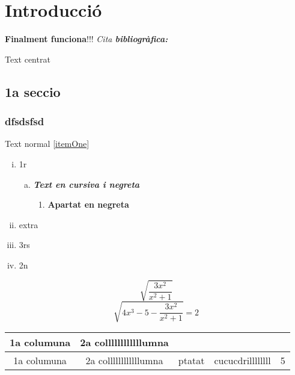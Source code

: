 \chapter{Introducció}

\textbf{Finalment funciona}!!!
\textit{Cita \textbf{bibliogràfica:}} \cite{TP}

\begin{center}
  Text centrat
\end{center}
\section{1a seccio}

\subsection{dfsdsfsd}

Text normal \ref{itemOne}

\begin{enumerate}[i)]
 \item 1r
 \begin{enumerate}[a)]
  \item \textit{\textbf{Text en cursiva i negreta}}
  \begin{enumerate} [1)]
   \item \textbf{Apartat en negreta}
  \end{enumerate}

 \end{enumerate}
 \item extra
 \item\label{itemOne} 3rs
 \item 2n
\end{enumerate}

$$\sqrt{\frac{3x^2}{x^2 +1}}$$
$$\sqrt{{4x^3 -5} - \frac{3x^2}{x^2 +1}} = 2$$




\vspace*{4.3truecm}


\begin{tabular}{|c|c|c|l|r|}
 \hline 1a columuna & 2a collllllllllllumna &  & & \\ \hline
 1a columuna & 2a collllllllllllumna & ptatat & cucucdrillllllll & 5 \\ \hline

\end{tabular}
